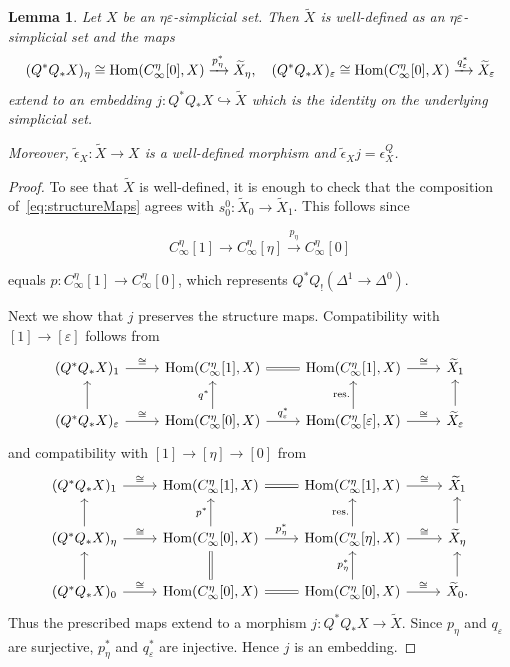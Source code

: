 \documentclass{article}
\theoremstyle{plain}
\newtheorem{lemma}[theorem]{Lemma}
\theoremstyle{definition}
\theoremstyle{remark}
\begin{document}
\begin{lemma}
Let $X$ be an $\eta\varepsilon$-simplicial set. Then $\widetilde{X}$ is well-defined as an $\eta\varepsilon$-simplicial set and the maps
\[
(Q^*Q_*X)_\eta\cong\mbox{\rm Hom}(C^\eta_\infty[0],X)
\xrightarrow{p_\eta^*}\widetilde X_\eta,
\quad
(Q^*Q_*X)_\varepsilon\cong\mbox{\rm Hom}(C^\eta_\infty[0],X)
\xrightarrow{q_\varepsilon^*}\widetilde X_\varepsilon
\]
extend to an embedding
$j\colon Q^*Q_*X\hookrightarrow\widetilde X$
which is the identity on the underlying simplicial set.

Moreover, $\tilde{\epsilon}_X\colon\widetilde{X}\rightarrow X$ is a well-defined morphism and $\tilde{\epsilon}_X j=\epsilon^Q_X$.
\end{lemma}
\begin{proof}
To see that $\widetilde X$ is well-defined, it is enough to check that the composition of~\eqref{eq:structureMaps} agrees with
$s^0_0\colon\widetilde X_0\to\widetilde X_1$. This follows since

$$
C^\eta_\infty[1]\longrightarrow C^\eta_\infty[\eta]
\xrightarrow{p_\eta}C^\eta_\infty[0]
$$

equals $p\colon C^\eta_\infty[1]\to C^\eta_\infty[0]$, which represents
$Q^*Q_!(\Delta^1\to\Delta^0)$.

Next we show that $j$ preserves the structure maps. Compatibility with
$[1]\to[\varepsilon]$ follows from
\begin{equation}
\begin{tikzcd}
{(Q^*Q_*X)_1}\arrow[r,"\cong"]
&{\Hom(C_\infty^\eta[1],X)}\arrow[r,equal]
&{\Hom(C^\eta_\infty[1],X)}\arrow[r,"\cong"]
&{\widetilde X_1}\\
{(Q^*Q_*X)_\varepsilon}\arrow[r,"\cong"]\arrow[u]
&{\Hom(C_\infty^\eta[0],X)}\arrow[u,"q^*"]\arrow[r,"q_\varepsilon^*"]
&{\Hom(C^\eta_\infty[\varepsilon],X)}\arrow[u,"\mathrm{res.}"]\arrow[r,"\cong"]
&{\widetilde X_\varepsilon}\arrow[u]
\end{tikzcd}
\end{equation}
and compatibility with $[1]\to[\eta]\to[0]$ from
\begin{equation}
\begin{tikzcd}
{(Q^*Q_*X)_1}\arrow[r,"\cong"]
&{\Hom(C^\eta_\infty[1],X)}\arrow[r,equal]
&{\Hom(C^\eta_\infty[1],X)}\arrow[r,"\cong"]
&{\widetilde X_1}\\
{(Q^*Q_*X)_\eta}\arrow[u]\arrow[r,"\cong"]
&{\Hom(C^\eta_\infty[0],X)}\arrow[u,"p^*"]\arrow[r,"p_\eta^*"]
&{\Hom(C^\eta_\infty[\eta],X)}\arrow[u,"\mathrm{res.}"]\arrow[r,"\cong"]
&{\widetilde X_\eta}\arrow[u]\\
{(Q^*Q_*X)_0}\arrow[u]\arrow[r,"\cong"]
&{\Hom(C^\eta_\infty[0],X)}\arrow[u,equal]\arrow[r,equal]
&{\Hom(C^\eta_\infty[0],X)}\arrow[u,"p_\eta^*"]\arrow[r,"\cong"]
&{\widetilde X_0}\arrow[u].
\end{tikzcd}
\end{equation}
Thus the prescribed maps extend to a morphism
$j\colon Q^*Q_*X\to\widetilde X$. Since $p_\eta$ and $q_\varepsilon$ are
surjective, $p_\eta^*$ and $q_\varepsilon^*$ are injective. Hence $j$ is
an embedding.


\end{proof}
\end{document}
